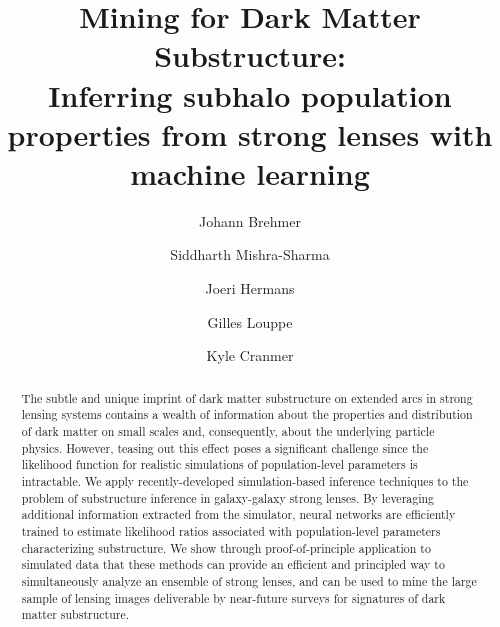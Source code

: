 \documentclass[twocolumn]{aastex63}
\begin{document}
\sloppy\sloppypar\raggedbottom\frenchspacing

\title{\textbf{
Mining for Dark Matter Substructure: \\
Inferring subhalo population properties from strong lenses with machine learning
}}


\author[0000-0003-3344-4209]{Johann Brehmer}

\author[0000-0001-9088-7845]{Siddharth Mishra-Sharma}

\author[0000-0002-1471-2063]{Joeri Hermans}

\author[0000-0002-2082-3106]{Gilles Louppe}

\author[0000-0002-5769-7094]{Kyle Cranmer}

\begin{abstract}\noindent
The subtle and unique imprint of dark matter substructure on extended arcs in strong lensing systems contains a wealth of information about the properties and distribution of dark matter on small scales and, consequently, about the underlying particle physics. However, teasing out this effect poses a significant challenge since the likelihood function for realistic simulations of population-level parameters is intractable. We apply recently-developed simulation-based inference techniques to the problem of substructure inference in galaxy-galaxy strong lenses. By leveraging additional information extracted from the simulator, neural networks are efficiently trained to estimate likelihood ratios associated with population-level parameters characterizing substructure. We show through proof-of-principle application to simulated data that these methods can provide an efficient and principled way to simultaneously analyze an ensemble of strong lenses, and can be used to mine the large sample of lensing images deliverable by near-future surveys for signatures of dark matter substructure. \href{https://github.com/smsharma/StrongLensing-Inference}{\faGithub} \href{https://doi.org/}{\faTags}
\end{abstract}
\end{document}
